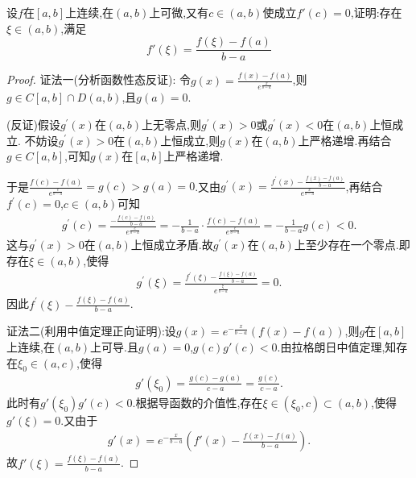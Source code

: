 \documentclass[lang=cn,newtx,10pt,scheme=chinese]{../Template/elegantbook}
\begin{document}
\begin{exercise}
    设\(f\)在\([a,b]\)上连续,在\((a,b)\)上可微,又有\(c\in(a,b)\)使成立\(f'(c) = 0\),证明:存在\(\xi\in(a,b)\),满足
    \[
    f'(\xi)=\frac{f(\xi)-f(a)}{b - a}
    \]
\end{exercise}
\begin{proof}
    {\color{blue}证法一(分析函数性态反证):}
    令\(g(x) = \frac{f(x) - f(a)}{e^{\frac{x}{b - a}}}\),则\(g\in C[a,b] \cap D(a,b)\),且\(g(a) = 0\).

    (反证)假设\(g^{\prime}(x)\)在\((a,b)\)上无零点,则\(g^{\prime}(x) > 0\)或\(g^{\prime}(x) < 0\)在\((a,b)\)上恒成立.
    不妨设\(g^{\prime}(x) > 0\)在\((a,b)\)上恒成立,则\(g(x)\)在\((a,b)\)上严格递增.再结合\(g\in C[a,b]\),可知\(g(x)\)在\([a,b]\)上严格递增.
    
    于是\(\frac{f(c) - f(a)}{e^{\frac{c}{b - a}}} = g(c) > g(a) = 0\).又由\(g^{\prime}(x) = \frac{f^{\prime}(x) - \frac{f(x) - f(a)}{b - a}}{e^{\frac{x}{b - a}}}\),再结合\(f^{\prime}(c) = 0\),\(c\in (a,b)\)可知
    \begin{align*}
        g^{\prime}(c) = \frac{-\frac{f(c) - f(a)}{b - a}}{e^{\frac{c}{b - a}}} = -\frac{1}{b - a} \cdot \frac{f(c) - f(a)}{e^{\frac{c}{b - a}}} = -\frac{1}{b - a}g(c) < 0.
    \end{align*}
    这与\(g^{\prime}(x) > 0\)在\((a,b)\)上恒成立矛盾.故\(g^{\prime}(x)\)在\((a,b)\)上至少存在一个零点.即存在\(\xi \in (a,b)\),使得
    \begin{align*}
        g^{\prime}(\xi) = \frac{f^{\prime}(\xi) - \frac{f(\xi) - f(a)}{b - a}}{e^{\frac{\xi}{b - a}}} = 0.
    \end{align*}
    因此\(f^{\prime}(\xi) - \frac{f(\xi) - f(a)}{b - a}\). 

    {\color{blue}证法二(利用中值定理正向证明):}设\(g(x)=e^{-\frac{x}{b - a}}(f(x)-f(a))\),则\(g\)在\([a,b]\)上连续,在\((a,b)\)上可导.且\(g(a) = 0\),\(g(c)g'(c)<0\).由拉格朗日中值定理,知存在\(\xi_0\in(a,c)\),使得
    \begin{align*}
        g'(\xi_0)=\frac{g(c)-g(a)}{c - a}=\frac{g(c)}{c - a}.
    \end{align*}
    此时有\(g'(\xi_0)g'(c)<0\).根据导函数的介值性,存在\(\xi\in(\xi_0,c)\subset(a,b)\),使得\(g'(\xi)=0\).又由于
    \begin{align*}
        g'(x)=e^{-\frac{x}{b - a}}\left(f'(x)-\frac{f(x)-f(a)}{b - a}\right).
    \end{align*}
故\(f'(\xi)=\frac{f(\xi)-f(a)}{b - a}\).

\end{proof}
\end{document}
